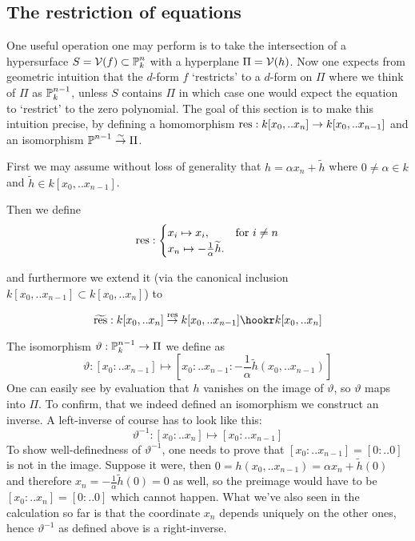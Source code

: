 \subsection{The restriction of equations}

One useful operation one may perform is to take the intersection of a hypersurface $S = \operatorname{\mathcal V}(f) \subset \operatorname{\mathbb P}^n_k$ with a hyperplane $\Pi = \operatorname{\mathcal V}(h)$. Now one expects from geometric intuition that the $d$-form $f$ `restricts' to a $d$-form on $\Pi$ where we think of $\Pi$ as $\operatorname{\mathbb P}^{n-1}_k$, unless $S$ contains $\Pi$ in which case one would expect the equation to `restrict' to the zero polynomial.
The goal of this section is to make this intuition precise, by defining a homomorphism ${\operatorname{res}} : k[x_0,..x_n] \to k[x_0,..x_{n-1}]$ and an isomorphism $\operatorname{\mathbb P}^{n-1} \overset\sim\to \Pi$.

First we may assume without loss of generality that
$h = \alpha x_n + \widetilde h$ where $0 \neq \alpha \in k$ and $\widetilde h \in k[x_0,..x_{n-1}]$.

Then we define
\begin{equation}
{\operatorname{res}} : \begin{cases}
x_i \mapsto x_i, & \text{for } i \neq n \\
x_n \mapsto -\frac 1\alpha \widetilde h. &
\end{cases}
\end{equation}

and furthermore we extend it (via the canonical inclusion $k[x_0,..x_{n-1}] \subset k[x_0,..x_n]$) to

\begin{equation}
\widetilde{\var{res}} : k[x_0,.. x_n] \overset{\var{res}}\to k[x_0,.. x_{n-1}] \hookr k[x_0,.. x_n]
\end{equation}

The isomorphism $\vartheta : \operatorname{\mathbb P}^{n-1}_k \to \Pi$ we define as
\begin{equation}
\vartheta : [x_0:..x_{n-1}] \mapsto [x_0:..x_{n-1}:-\frac 1\alpha \widetilde h(x_0,..x_{n-1})]
\end{equation}
One can easily see by evaluation that $h$ vanishes on the image of $\vartheta$, so $\vartheta$ maps into $\Pi$. To confirm, that we indeed defined an isomorphism we construct an inverse.
A left-inverse of course has to look like this:
\begin{equation}
\vartheta^{-1} : [x_0:..x_n] \mapsto [x_0:..x_{n-1}]
\end{equation}
To show well-definedness of $\vartheta^{-1}$, one needs to prove that $[x_0:..x_{n-1}] = [0:..0]$ is not in the image. Suppose it were, then $0 = h(x_0,..x_{n-1}) = \alpha x_n + \widetilde h(0)$ and therefore $x_n = -\frac 1\alpha \widetilde h(0) = 0$ as well, so the preimage would have to be $[x_0:..x_n] = [0:..0]$ which cannot happen.
What we've also seen in the calculation so far is that the coordinate $x_n$ depends uniquely on the other ones, hence $\vartheta^{-1}$ as defined above is a right-inverse.

